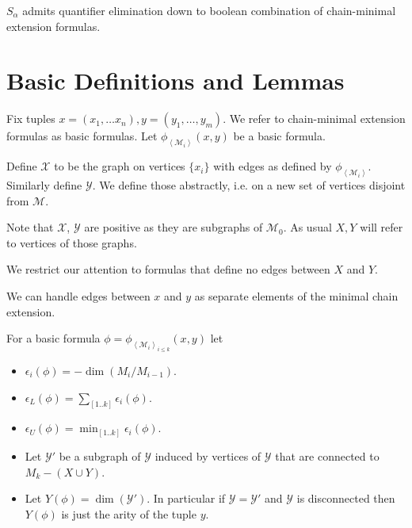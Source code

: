 \documentclass{amsart}
\newcommand{\MM}{\mathscr M}
\newcommand{\M}{\mathcal M}
\newcommand{\X}{\mathcal X}
\newcommand{\Y}{\mathcal Y}
\newcommand{\paren}[1]{\left(#1\right)}
\newcommand{\agl}[1]{\left\langle #1 \right\rangle}
\begin{document}
\begin{Theorem} 
  $S_\alpha$ admits quantifier elimination down to boolean combination of chain-minimal extension formulas.
\end{Theorem}


\section{Basic Definitions and Lemmas}

Fix tuples $x = (x_1, \ldots x_n), y = (y_1, \ldots, y_m)$.
We refer to chain-minimal extension formulas as basic formulas.
Let $\phi_{\agl{\M_i}}(x, y)$ be a basic formula.

\begin{Definition}
  Define $\X$ to be the graph on vertices $\{x_i\}$ with edges as defined by $\phi_{\agl{\M_i}}$.
  Similarly define $\Y$.
  We define those abstractly, i.e. on a new set of vertices disjoint from $\MM$.
\end{Definition}

Note that $\X$, $\Y$ are positive as they are subgraphs of $\M_0$.
As usual $X, Y$ will refer to vertices of those graphs.

We restrict our attention to formulas that define no edges between $X$ and $Y$.

\begin{Note} \label{note_edges}
  We can handle edges between $x$ and $y$ as separate elements of the minimal chain extension.
\end{Note}

\begin{Definition} \label{def_basic}
  For a basic formula $\phi = \phi_{\agl{\M_i}_{i \leq k}}(x, y)$ let
  \begin{itemize}
  \item $\epsilon_i(\phi) = -\dim \paren{M_i/M_{i-1}}$.
  \item $\epsilon_L(\phi) = \sum_{[1..k]} \epsilon_i(\phi)$.
  \item $\epsilon_U(\phi) = \min_{[1..k]} \epsilon_i(\phi)$.
  \item Let $\Y'$ be a subgraph of $\Y$ induced by vertices of $\Y$ that are connected to $M_k - (X \cup Y)$.
  \item Let $Y(\phi) = \dim (\Y')$.
    In particular if $\Y = \Y'$ and $\Y$ is disconnected then $Y(\phi)$ is just the arity of the tuple $y$.
  \end{itemize}
\end{Definition}
\end{document}
